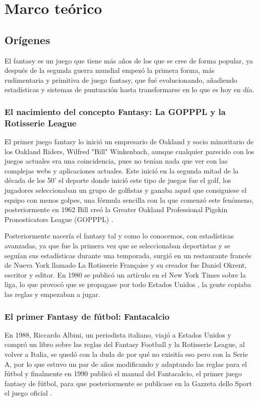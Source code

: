 \chapter{Marco teórico}
\label{chap:marco_teorico}

\section{Orígenes} El fantasy es un juego que tiene más años de los que se cree de forma popular, ya después de la segunda guerra mundial empezó la primera forma, más rudimentaria y primitiva de juego fantasy, que fué evolucionando, añadiendo estadísticas y sistemas de puntuación hasta transformarse en lo que es hoy en día.

    \subsection{El nacimiento del concepto Fantasy: La GOPPPL y la Rotisserie League} 
    El primer juego fantasy lo inició un empresario de Oakland y socio minoritario de los Oakland Riders, Wilfred "Bill" Winkenbach, aunque cualquier parecido con los juegos actuales era una coincidencia, pues no tenían nada que ver con las complejas webs y aplicaciones actuales. Este inició en la segunda mitad de la década de los 50' el deporte donde inició este tipo de juegos fue el golf, los jugadores seleccionaban un grupo de golfistas y ganaba aquel que consiguiese el equipo con menos golpes, una fórmula sencilla con la que comenzó este fenómeno, posteriormente en 1962 Bill creó la Greater Oakland Professional Pigskin Pronosticators League (GOPPPL) \cite{origen_gopppl}. 
    
    Posteriormente nacería el fantasy tal y como lo conocemos, con estadísticas avanzadas, ya que fue la primera vez que se seleccionaban deportistas y se seguían sus estadísticas durante una temporada, surgió en un restaurante francés de Nueva York llamado La Rotisserie Française y su creador fue Daniel Okrent, escritor y editor. En 1980 se publicó un artículo en el New York Times sobre la liga, lo que provocó que se propagase por todo Estados Unidos \cite{rotisserie_nyt}, la gente copiaba las reglas y empezaban a jugar.

    \subsection{El primer Fantasy de fútbol: Fantacalcio} 
    En 1988, Riccardo Albini, un periodista italiano, viajó a Estados Unidos y compró un libro sobre las reglas del Fantasy Football y la Rotisserie League, al volver a Italia, se quedó con la duda de por qué no exisitía eso pero con la Serie A, por lo que estuvo un par de años modificando y adaptando las reglas para el fútbol y finalmente en 1990 publicó el manual del Fantacalcio, el primer juego fantasy de fútbol, para que posteriormente se publicase en la Gazzeta dello Sport el juego oficial \cite{fantacalcio_historia}.


